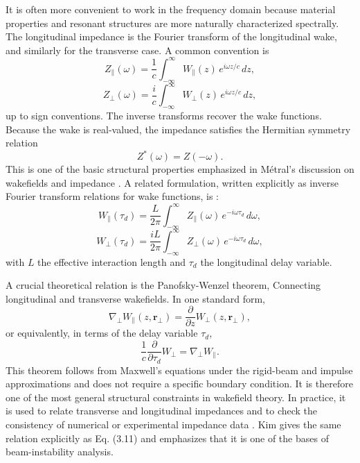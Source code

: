 It is often more convenient to work in the frequency domain because material properties and resonant structures are more naturally characterized spectrally. The longitudinal impedance is the Fourier transform of the longitudinal wake, and similarly for the transverse case. A common convention is
\begin{equation}
Z_{\parallel}(\omega)
=
\frac{1}{c}
\int_{-\infty}^{\infty}
W_{\parallel}(z)\,e^{i\omega z/c}\,dz,
\label{eq:Zlong}
\end{equation}
\begin{equation}
Z_{\perp}(\omega)
=
\frac{i}{c}
\int_{-\infty}^{\infty}
W_{\perp}(z)\,e^{i\omega z/c}\,dz,
\label{eq:Ztrans}
\end{equation}
up to sign conventions. The inverse transforms recover the wake functions. Because the wake is real-valued, the impedance satisfies the Hermitian symmetry relation
\begin{equation}
Z^*(\omega)=Z(-\omega).
\label{eq:impedance_symmetry}
\end{equation}
This is one of the basic structural properties emphasized in Métral’s discussion on wakefields and impedance \cite{metral_wake_2021}. A related formulation, written explicitly as inverse Fourier transform relations for wake functions, is \cite{kim_mbtrack2_cuda_2025}:
\begin{equation}
W_{\parallel}(\tau_d)
=
\frac{L}{2\pi}
\int_{-\infty}^{\infty}
Z_{\parallel}(\omega)\,e^{-i\omega \tau_d}\,d\omega,
\end{equation}
\begin{equation}
W_{\perp}(\tau_d)
=
\frac{iL}{2\pi}
\int_{-\infty}^{\infty}
Z_{\perp}(\omega)\,e^{-i\omega \tau_d}\,d\omega,
\end{equation}
with $L$ the effective interaction length and $\tau_d$ the longitudinal delay variable. 

A crucial theoretical relation is the Panofsky-Wenzel theorem, Connecting longitudinal and transverse wakefields. In one standard form,
\begin{equation}
\nabla_{\perp} W_{\parallel}(z,\mathbf r_{\perp})
=
\frac{\partial}{\partial z} W_{\perp}(z,\mathbf r_{\perp}),
\label{eq:PW}
\end{equation}
or equivalently, in terms of the delay variable $\tau_d$,
\begin{equation}
\frac{1}{c}\frac{\partial}{\partial \tau_d} W_{\perp}
=
\nabla_{\perp}W_{\parallel}.
\label{eq:PW_tau}
\end{equation}
This theorem follows from Maxwell’s equations under the rigid-beam and impulse approximations and does not require a specific boundary condition. It is therefore one of the most general structural constraints in wakefield theory. In practice, it is used to relate transverse and longitudinal impedances and to check the consistency of numerical or experimental impedance data \cite{metral_wake_2021}. Kim \cite{kim_mbtrack2_cuda_2025} gives the same relation explicitly as Eq. (3.11) and emphasizes that it is one of the bases of beam-instability analysis. 





